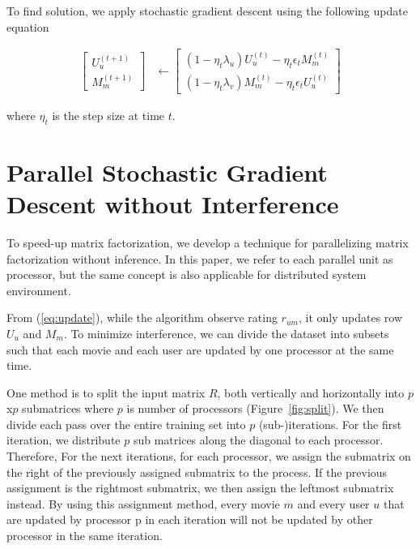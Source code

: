 \documentclass{article} %
\newcommand{\U}{U}
\newcommand{\M}{M}
\begin{document}
To find solution, we apply stochastic gradient descent using the following update equation

\begin{align}
\left[\begin{array}{c}
\U_u^{(t+1)}
\\
\M_m^{(t+1)}
\end{array}\right]
& \leftarrow
\left[\begin{array}{c}
(1-\eta_t \lambda_u) \U_u^{(t)} - \eta_t \epsilon_t \M_m^{(t)}
\\
(1-\eta_t \lambda_v) \M_m^{(t)} - \eta_t \epsilon_t \U_u^{(t)}
\end{array}\right]
\label{eq:update}
\end{align}

where $\eta_t$ is the step size at time $t$.

\section{Parallel Stochastic Gradient Descent without Interference}

To speed-up matrix factorization, we develop a technique for parallelizing matrix factorization without inference.
In this paper, we refer to each parallel unit as processor, but the same concept is also applicable for distributed system environment.

From (\ref{eq:update}), while the algorithm observe rating $r_{um}$,
it only updates row $\U_u$ and $M_m$.
To minimize interference, we can divide the dataset into subsets such that each movie and each user are updated by one processor at the same time.

One method is to split the input matrix $R$, both vertically and horizontally
into $p$x$p$ submatrices where $p$ is number of processors
(Figure~\ref{fig:split}). We then divide each pass over the entire training
set into $p$ (sub-)iterations. For the first iteration, we distribute $p$ sub
matrices along the diagonal to each processor.  Therefore,   For the next
iterations, for each processor, we assign the submatrix on the right of the
previously assigned submatrix to the process.  If the previous assignment is
the rightmost submatrix, we then assign the leftmost submatrix instead. By
using this assignment method, every movie $m$ and every user $u$ that are
updated by processor p in each iteration will not be updated by other
processor in the same iteration.
\end{document}
